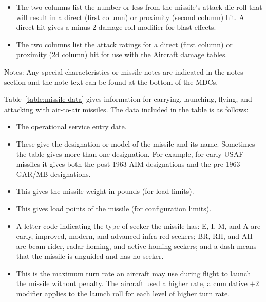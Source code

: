 {\begin{itemize}
    \item {} The two columns list the number or less from the missile's attack die roll that will result in a direct (first column) or proximity (second column) hit. A direct hit gives a minus 2 damage roll modifier for blast effects.

    \item {} The two columns list the attack ratings for a direct (first column) or  proximity (2d column) hit for use with the Aircraft damage tables.

\end{itemize}

Notes: Any special characteristics or missile notes are indicated in the notes section and the note text can be found at the bottom of the MDCs.

}{
Table~\ref{table:missile-data} gives information for carrying, launching, flying, and attacking with air-to-air missiles. The data included in the table is as follows:

\begin{itemize}

    \item {} The operational service entry date.
    
    \item {} These give the designation or model of the missile and its name. Sometimes the table gives more than one designation. For example, for early USAF missiles it gives both the post-1963 AIM designations and the pre-1963 GAR/MB designations.

    \item {} This gives the missile weight in pounds (for load limits).

    \item {} This gives load points of the missile (for configuration limits).

    \item {} A letter code indicating the type of seeker the missile has: E, I, M, and A are early, improved, modern, and advanced infra-red seekers; BR, RH, and AH are beam-rider, radar-homing, and active-homing seekers; and a dash means that the missile is unguided and has no seeker.

    \item {} This is the maximum turn rate an aircraft may use during flight to launch the missile without penalty. The aircraft used a higher rate, a cumulative $+2$ modifier applies to the launch roll for each level of higher turn rate.


\end{itemize}}
